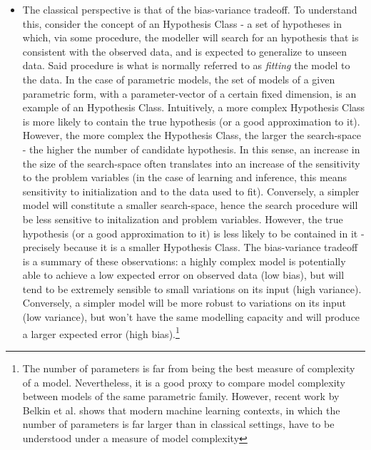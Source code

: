 \begin{itemize}
    \item The classical perspective is that of the bias-variance tradeoff. To
        understand this, consider the concept of an Hypothesis Class - a set
        of hypotheses in which, via some procedure, the modeller will search
        for an hypothesis that is consistent with the observed data, and is
        expected to generalize to unseen data. Said procedure is what is normally
        referred to as \emph{fitting} the model to the data. In the case of
        parametric models, the set of models of a given parametric form, with
        a parameter-vector of a certain fixed dimension, is an example of an Hypothesis
        Class. Intuitively, a more complex Hypothesis Class is more likely to
        contain the true hypothesis (or a good approximation to it). However,
        the more complex the Hypothesis Class, the larger the search-space -
        the higher the number of candidate hypothesis. In this sense, an increase
        in the size of the search-space often translates into an increase of the
        sensitivity to the problem variables (in the case of learning and inference,
        this means sensitivity to initialization and to the data used to fit).
        Conversely, a simpler model will constitute a smaller search-space, hence
        the search procedure will be less sensitive to initalization and problem
        variables. However, the true hypothesis (or a good approximation to it)
        is less likely to be contained in it - precisely because it is a smaller
        Hypothesis Class. The bias-variance tradeoff is a summary of these observations:
        a highly complex model is potentially able to achieve a low expected error
        on observed data (low bias), but will tend to be extremely sensible to small
        variations on its input (high variance). Conversely, a simpler model will
        be more robust to variations on its input (low variance), but won't have the same
        modelling capacity and will produce a larger expected error (high bias).\footnote{
        The number of parameters is far from being the best measure of complexity
        of a model. Nevertheless, it is a good proxy to compare model complexity
        between models of the same parametric family. However, recent work by
        Belkin et al. \cite{Belkin2018Dec} shows that modern machine learning
        contexts, in which the number of parameters is far larger than in classical
        settings, have to be understood under a measure of model complexity
}
\end{itemize}
